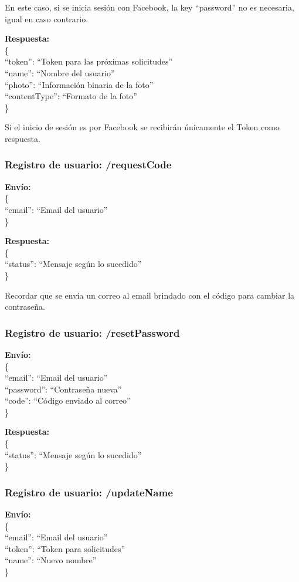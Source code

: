 \documentclass[12pt,letterpaper]{article}
\begin{document}
En este caso, si se inicia sesión con Facebook, la key ``password'' no es necesaria, igual en caso contrario.


\noindent
\textbf{Respuesta: }\\
\noindent
\{ \\
``token'': ``Token para las próximas solicitudes'' \\
``name'': ``Nombre del usuario'' \\
``photo'': ``Información binaria de la foto'' \\
``contentType'': ``Formato de la foto'' \\
\}

Si el inicio de sesión es por Facebook se recibirán únicamente el Token como respuesta.

\subsubsection{Registro de usuario: /requestCode}
\noindent
\textbf{Envío: }\\
\noindent
\{ \\
``email'': ``Email del usuario'' \\
\}

\noindent
\textbf{Respuesta: }\\
\noindent
\{ \\
``status'': ``Mensaje según lo sucedido'' \\
\}

Recordar que se envía un correo al email brindado con el código para cambiar la contraseña.

\subsubsection{Registro de usuario: /resetPassword}
\noindent
\textbf{Envío: }\\
\noindent
\{ \\
``email'': ``Email del usuario'' \\
``password'': ``Contraseña nueva'' \\
``code'': ``Código enviado al correo'' \\
\}

\noindent
\textbf{Respuesta: }\\
\noindent
\{ \\
``status'': ``Mensaje según lo sucedido'' \\
\}

\subsubsection{Registro de usuario: /updateName}
\noindent
\textbf{Envío: }\\
\noindent
\{ \\
``email'': ``Email del usuario'' \\
``token'': ``Token para solicitudes'' \\
``name'': ``Nuevo nombre'' \\
\}
\end{document}
